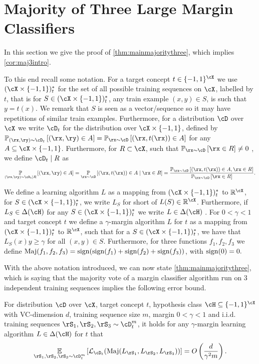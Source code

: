 \section{Majority of Three Large Margin Classifiers}\label{sec:mainmajoritythree}
In this section we give the proof of \cref{thm:mainmajoritythree}, which implies \cref{cor:maj3intro}. 

To this end recall some notation. For a target concept $ t \in \{  -1,1\}^{\cX}  $ we use $ (\cX\times\{  -1,1\})_{t}^{*} $ for the set of all possible training sequences on $ \cX $, labelled by $ t $, that is for $ S\in (\cX\times\{  -1,1\})_{t}^{*} $, any train example $ (x,y)\in S $, is such that $ y=t(x).$ We remark that $ S $ is seen as a vector/sequence so it may have repetitions of similar train examples. Furthermore, for a distribution $ \cD $ over $ \cX $ we write $ \cD_{t} $ for the distribution over $ \cX\times\{  -1,1\}  $, defined by $ \p_{(\rx,\ry)\sim\cD_{t}}\left[(\rx,\ry)\in A\right]=\p_{\rx\sim \cD}\left[(\rx,t(\rx))\in A\right] $ for any  $ A\subseteq \cX\times\{  -1,1\}$. Furthermore, for $ R\subset \cX $, such that $ \p_{\rx\sim\cD}\left[\rx\in R\right]\not=0 $ , we define $ \cD_{t}\mid R $ as $$ \p_{(\rx,\ry)\sim\cD_{t}\mid R}\left[(\rx,\ry)\in A\right]=\p_{\rx\sim \cD}\left[(\rx,t(\rx))\in A\mid \rx\in R\right]= \frac{\p_{\rx\sim \cD}\left[(\rx,t(\rx))\in A, \rx\in R\right]}{\p_{\rx\sim \cD}\left[\rx\in R\right]}.$$

We define a learning algorithm $ L $  as a mapping from $ (\cX\times\{  -1,1\})_{t}^{*} $ to $ \mathbb{R}^{\cX} $, for $ S\in (\cX\times\{  -1,1\})_{t}^{*} $, we write $ L_{S} $ for short of $ L(S)\in\mathbb{R}^{\cX} $. Furthermore, if $ L_{S} \in \dlh$ for any $ S\in (\cX\times\{  -1,1\})_{t}^{*} $ we write $ L\in \dlh $ . For $ 0<\gamma<1 $ and target concept $ t $  we define a $ \gamma $-margin algorithm $ L $ for $ t $   as a mapping from $ (\cX\times\{  -1,1\})_{t}^{*} $ to $ \mathbb{R}^{\cX} $, such that for a $ S\in (\cX\times\{  -1,1\})_{t}^{*} $, we have that $ L_{S}(x)y\geq \gamma $ for all $ (x,y)\in S.$ Furthermore, for three functions $ f_{1},f_{2},f_{3} $ we define $ \operatorname{\mathrm{Maj}}(f_{1},f_{2},f_{3})=\operatorname{\mathrm{sign}}(\operatorname{\mathrm{sign}}(f_{1})+\operatorname{\mathrm{sign}}(f_{2})+\operatorname{\mathrm{sign}}(f_{3})) $, with $ \operatorname{\mathrm{sign}}(0)=0.$  

 With the above notation introduced, we can now state \cref{thm:mainmajoritythree}, which is saying that the majority vote of a margin classifier algorithm run on 3 independent training sequences implies the following error bound.
\begin{theorem}\label{thm:mainmajoritythree}
    For distribution $ \cD $ over $ \cX $, target concept $ t $,  hypothesis class $ \cH \subseteq \{-1,1  \}^{\cX} $ with VC-dimension $ d $,  training sequence size $ m $, margin $ 0<\gamma<1 $ and i.i.d. training sequences $ \rS_{1},\rS_{2},\rS_{3}\sim \cD_{t}^{m} $, it holds for any $ \gamma $-margin learning algorithm $ L\in \dlh $ for $ t $ that  
    \begin{align*}
    \e_{\rS_{1},\rS_{2},\rS_{3}\sim \cD^{m}_{t}}\left[\ls_{\cD_{t}}(\maj(L_{\rS_{1}},L_{\rS_{2}},L_{\rS_{3}}))\right] =O\left(\frac{d}{\gamma^{2}m}\right).
    \end{align*}
\end{theorem}

